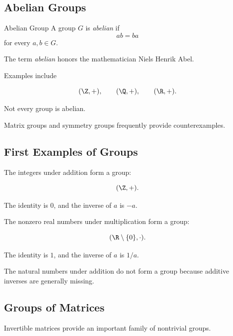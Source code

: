 \subsection{Abelian Groups}
\label{subsec:abelian-groups}

\begin{definitionbox}{Abelian Group}
A group \(G\) is \emph{abelian} if
\[ ab=ba \]
for every \(a,b\in G\).
\end{definitionbox}

The term \emph{abelian} honors the mathematician Niels Henrik Abel.

Examples include

\[ (\Z,+),\qquad (\Q,+),\qquad (\R,+). \]

Not every group is abelian.

Matrix groups and symmetry groups frequently provide counterexamples.

\subsection{First Examples of Groups}
\label{subsec:first-group-examples}

The integers under addition form a group:

\[ (\Z,+). \]

The identity is \(0\), and the inverse of \(a\) is \(-a\).

The nonzero real numbers under multiplication form a group:

\[ (\R\setminus\{0\},\cdot). \]

The identity is \(1\), and the inverse of \(a\) is \(1/a\).

The natural numbers under addition do not form a group because additive
inverses are generally missing.

\subsection{Groups of Matrices}
\label{subsec:matrix-groups}

Invertible matrices provide an important family of nontrivial groups.


